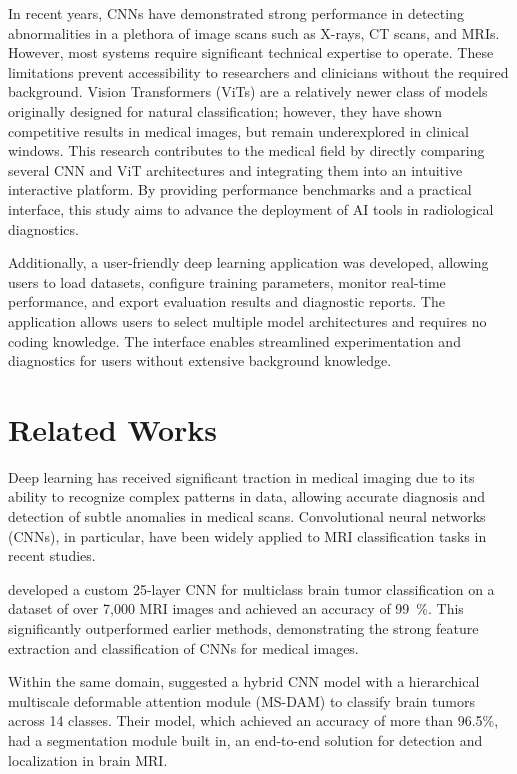 \documentclass[11pt]{article}
\begin{document}
In recent years, CNNs have demonstrated strong performance in detecting abnormalities in a plethora of image scans such as X-rays, CT scans, and MRIs. However, most systems require significant technical expertise to operate. These limitations prevent accessibility to researchers and clinicians without the required background. Vision Transformers (ViTs) are a relatively newer class of models originally designed for natural classification; however, they have shown competitive results in medical images, but remain underexplored in clinical windows. This research contributes to the medical field by directly comparing several CNN and ViT architectures and integrating them into an intuitive interactive platform. By providing performance benchmarks and a practical interface, this study aims to advance the deployment of AI tools in radiological diagnostics.

Additionally, a user-friendly deep learning application was developed, allowing users to load datasets, configure training parameters, monitor real-time performance, and export evaluation results and diagnostic reports. The application allows users to select multiple model architectures and requires no coding knowledge. The interface enables streamlined experimentation and diagnostics for users without extensive background knowledge.

\section{Related Works}

Deep learning has received significant traction in medical imaging due to its ability to recognize complex patterns in data, allowing accurate diagnosis and detection of subtle anomalies in medical scans. Convolutional neural networks (CNNs), in particular, have been widely applied to MRI classification tasks  in recent studies. 

\textcite{albalawi2024enhancing} developed a custom 25-layer CNN for multiclass brain tumor classification on a dataset of over 7,000 MRI images and achieved an accuracy of 99~\%. This significantly outperformed earlier methods, demonstrating the strong feature extraction and classification of CNNs for medical images.

Within the same domain, \textcite{zarenia2025automated} suggested a hybrid CNN model with a hierarchical multiscale deformable attention module (MS-DAM) to classify brain tumors across 14 classes. Their model, which achieved an accuracy of more than 96.5\%, had a segmentation module built in, an end-to-end solution for detection and localization in brain MRI.
\end{document}
